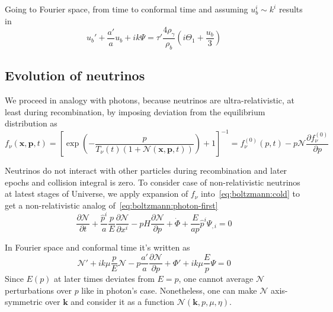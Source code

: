 \documentclass[12pt]{extarticle}
\numberwithin{problem}{section}
\numberwithin{theorem}{section}
\begin{document}
	Going to Fourier space, from time to conformal time and assuming $u^i_b\sim k^i$ results in 
	\begin{equation}
		\label{eq:baryons}
		u_b' + \frac{a'}{a}u_b + ik\Psi = \tau'\frac{4\rho_\gamma}{\rho_b}\left(i\Theta_1 + \frac{u_b}{3}\right)		
	\end{equation}

	\subsection{Evolution of neutrinos}
	We proceed in analogy with photons, because neutrinos are ultra-relativistic, at least during recombination, by imposing deviation from the equilibrium distribution as
	\begin{equation}
		f_\nu(\mathbf{x}, \mathbf{p}, t) = \left[\exp\left(-\frac{p}{T_\nu(t)(1 + \mathcal{N}(\mathbf{x}, \mathbf{p}, t))}\right) + 1\right]^{-1} = f_\nu^{(0)}(p, t) - p\mathcal{N}\frac{\partial f_\nu^{(0)}}{\partial p}
	\end{equation}

	Neutrinos do not interact with other particles during recombination and later epochs and collision integral is zero. To consider case of non-relativistic neutrinos at latest stages of Universe, we apply expansion of $f_\nu$ into~\ref{eq:boltzmann:cold} to get a non-relativistic analog of~\ref{eq:boltzmann:photon-first}
	\begin{equation}
		\frac{\partial\mathcal{N}}{\partial t} + \frac{\hat{p}^i}{a}\frac{p}{E}\frac{\partial\mathcal{N}}{\partial x^i} - pH\frac{\partial\mathcal{N}}{\partial p} + \dot{\Phi} + \frac{E}{ap}\hat{p}^i\Psi_{,i} = 0
	\end{equation}
	
	In Fourier space and conformal time it's written as
	\begin{equation}
		\mathcal{N}' + ik\mu\frac{p}{E}\mathcal{N} - p\frac{a'}{a}\frac{\partial\mathcal{N}}{\partial p} + \Phi' + ik\mu\frac{E}{p}\Psi = 0
	\end{equation}
	Since $E(p)$ at later times deviates from $E=p$, one cannot average $\mathcal{N}$ perturbations over $p$ like in photon's case. Nonetheless, one can make $\mathcal{N}$ axis-symmetric over $\mathbf{k}$ and consider it as a function $\mathcal{N}(\mathbf{k}, p, \mu, \eta)$.
\end{document}

